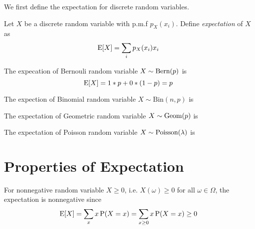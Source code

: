 We first define the expectation for discrete random variables.

Let $X$ be a discrete random variable with p.m.f $p_X(x_i)$. Define \textit{expectation} of $X$ as
$$\operatorname{E}[X] = \sum_i p_X(x_i) x_i$$

\begin{exmp}{}
The expecation of Bernouli random variable $X\sim \mathrm{Bern}(p)$ is
$$\operatorname{E}[X] = 1*p + 0 * (1-p) = p$$
\end{exmp}

\begin{exmp}{}
	The expection of Binomial random variable $X\sim \mathrm{Bin}(n,p)$ is
\end{exmp}

\begin{exmp}{}
	The expectation of Geometric random variable $X \sim \mathrm{Geom}(p)$ is
\end{exmp}

\begin{exmp}{}
	The expectation of Poisson random variable $X\sim \mathrm{Poisson}(\lambda)$ is
\end{exmp}

\section{Properties of Expectation}
For nonnegative random variable $X\geq 0$, i.e. $X(\omega) \geq 0$ for all $\omega\in \Omega$, the expectation is nonnegative since
$$\operatorname{E}[X] = \sum_x x\operatorname{P}(X=x) = \sum_{x\geq 0} x\operatorname{P}(X=x) \geq 0$$

